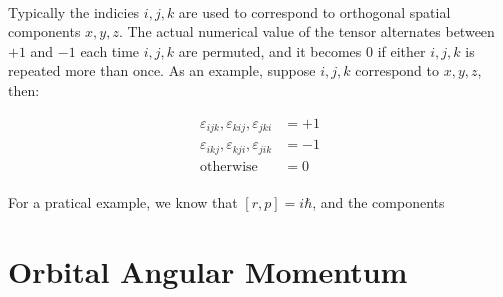 \documentclass[12pt,letterpaper]{book}
\begin{document}
\paragraph*{}Typically the indicies $i,j,k$ are used to correspond to orthogonal spatial components $x,y,z$. The actual numerical value of the tensor alternates between $+1$ and $-1$ each time $i,j,k$ are permuted, and it becomes $0$ if either $i,j,k$ is repeated more than once. As an example, suppose $i,j,k$ correspond to $x,y,z$, then:

\begin{equation}
\begin{split}
\varepsilon_{ijk},\varepsilon_{kij},\varepsilon_{jki} &= +1 \\
\varepsilon_{ikj},\varepsilon_{kji},\varepsilon_{jik} &= -1 \\
\text{otherwise} &= 0
\end{split}
\end{equation}

\paragraph*{}For a pratical example, we know that $[r,p] = i\hbar$, and the components




\section{Orbital Angular Momentum}
\end{document}
